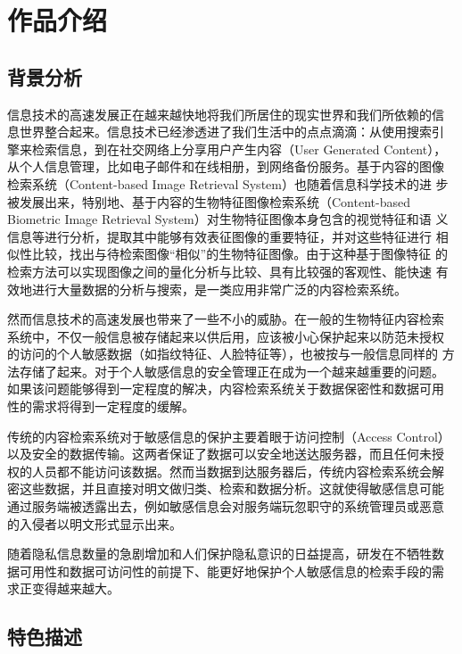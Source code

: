 
\chapter{作品介绍}
\label{chap:intro}

\section{背景分析}
\label{sec:bkg-analysis}

信息技术的高速发展正在越来越快地将我们所居住的现实世界和我们所依赖的信
息世界整合起来。信息技术已经渗透进了我们生活中的点点滴滴：从使用搜索引
擎来检索信息，到在社交网络上分享用户产生内容（User Generated Content），
从个人信息管理，比如电子邮件和在线相册，到网络备份服务。基于内容的图像
检索系统（Content-based Image Retrieval System）也随着信息科学技术的进
步被发展出来，特别地、基于内容的生物特征图像检索系统（Content-based
Biometric Image Retrieval System）对生物特征图像本身包含的视觉特征和语
义信息等进行分析，提取其中能够有效表征图像的重要特征，并对这些特征进行
相似性比较，找出与待检索图像“相似”的生物特征图像。由于这种基于图像特征
的检索方法可以实现图像之间的量化分析与比较、具有比较强的客观性、能快速
有效地进行大量数据的分析与搜索，是一类应用非常广泛的内容检索系统。

然而信息技术的高速发展也带来了一些不小的威胁。在一般的生物特征内容检索
系统中，不仅一般信息被存储起来以供后用，应该被小心保护起来以防范未授权
的访问的个人敏感数据（如指纹特征、人脸特征等），也被按与一般信息同样的
方法存储了起来。对于个人敏感信息的安全管理正在成为一个越来越重要的问题。
如果该问题能够得到一定程度的解决，内容检索系统关于数据保密性和数据可用
性的需求将得到一定程度的缓解。

传统的内容检索系统对于敏感信息的保护主要着眼于访问控制（Access Control）
以及安全的数据传输。这两者保证了数据可以安全地送达服务器，而且任何未授
权的人员都不能访问该数据。然而当数据到达服务器后，传统内容检索系统会解
密这些数据，并且直接对明文做归类、检索和数据分析。这就使得敏感信息可能
通过服务端被透露出去，例如敏感信息会对服务端玩忽职守的系统管理员或恶意
的入侵者以明文形式显示出来。

随着隐私信息数量的急剧增加和人们保护隐私意识的日益提高，研发在不牺牲数
据可用性和数据可访问性的前提下、能更好地保护个人敏感信息的检索手段的需
求正变得越来越大。

\section{特色描述}
\label{sec:spec-description}

